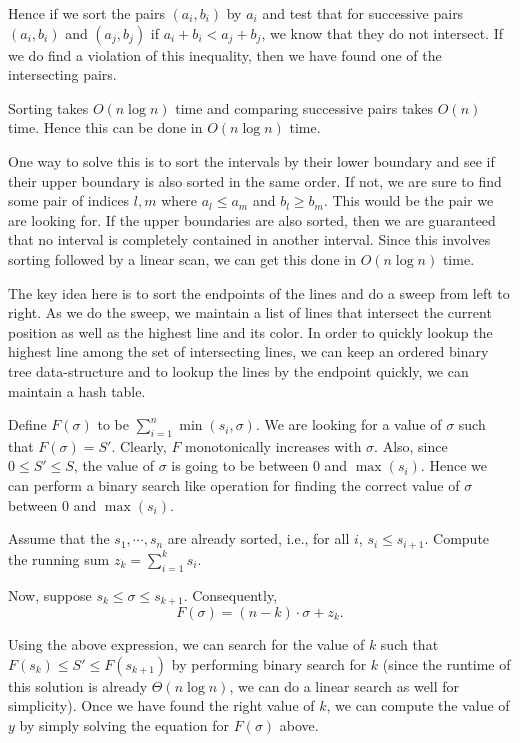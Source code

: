 Hence if we sort the pairs $(a_i, b_i)$ by $a_i$ and test that for
successive pairs $(a_i, b_i)$ and $(a_j, b_j)$ if $a_i + b_i < a_j +
b_j$, we know that they do not intersect. If we do find a
violation of this inequality, then we have found one of the
intersecting pairs.

Sorting takes $O(n \log n)$ time and comparing successive pairs
takes $O(n)$ time. Hence this can be done in $O(n \log n)$ time.

One way to solve this is to sort the intervals by their lower boundary
and see if their upper boundary is also sorted in the same order. If
not, we are sure to find some pair of indices $l,m$ where $a_l \le
a_m$ and $b_l \ge b_m$. This would be the pair we are looking for. If
the upper boundaries are also sorted, then we are guaranteed that no
interval is completely contained in another interval. Since this
involves sorting followed by a linear scan, we can get this done in
$O(n \log n)$ time.



The key idea here is to sort the endpoints of the lines and do a
sweep from left to right. As we do the sweep, we maintain a list of
lines that intersect the current position as well as the highest line
and its color.  In order to quickly lookup the highest line among
the set of intersecting lines, we can keep an ordered binary tree data-structure and to lookup the lines by the endpoint quickly, we can
maintain a hash table.

Define $F(\sigma)$ to be $\sum_{i=1}^{n}
\min(s_i,\sigma)$.  We are looking for a value of $\sigma$ such that $F(\sigma) =
S'$. Clearly, $F$ monotonically increases with $\sigma$. Also, since 
$0 \le S' \le S$, the value of $\sigma$ is going to be between $0$ and
$\max(s_i)$. Hence we can perform a binary search like operation for
finding the correct value of $\sigma$ between 0 and $\max(s_i)$. 

Assume that the $s_1,\cdots,s_n$ are already sorted, i.e., for all $i$, $s_i
\le s_{i+1}$.  Compute the running sum $z_k = \sum_{i=1}^{k}{s_i}$. 

Now, suppose $s_k \le \sigma \le s_{k+1}$. Consequently, \[F(\sigma) = (n - k) \cdot \sigma + z_k .\]

Using the above expression, we can search for the value of $k$ such that
$F(s_k) \le S' \le F(s_{k+1})$ by performing binary search for $k$
(since the runtime of this solution is already $\Theta(n \log n)$, we
can do a linear search as well for simplicity). Once we have found
the right value of $k$, we can compute the value of $y$ by simply
solving the equation for $F(\sigma)$ above.

